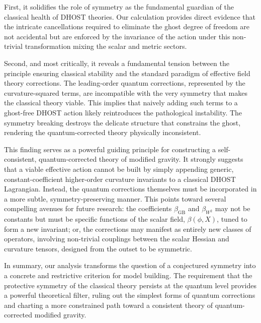 \documentclass[twocolumn]{aastex631}
\begin{document}
First, it solidifies the role of symmetry as the fundamental guardian of the classical health of DHOST theories. Our calculation provides direct evidence that the intricate cancellations required to eliminate the ghost degree of freedom are not accidental but are enforced by the invariance of the action under this non-trivial transformation mixing the scalar and metric sectors.

Second, and most critically, it reveals a fundamental tension between the principle ensuring classical stability and the standard paradigm of effective field theory corrections. The leading-order quantum corrections, represented by the curvature-squared terms, are incompatible with the very symmetry that makes the classical theory viable. This implies that naively adding such terms to a ghost-free DHOST action likely reintroduces the pathological instability. The symmetry breaking destroys the delicate structure that constrains the ghost, rendering the quantum-corrected theory physically inconsistent.

This finding serves as a powerful guiding principle for constructing a self-consistent, quantum-corrected theory of modified gravity. It strongly suggests that a viable effective action cannot be built by simply appending generic, constant-coefficient higher-order curvature invariants to a classical DHOST Lagrangian. Instead, the quantum corrections themselves must be incorporated in a more subtle, symmetry-preserving manner. This points toward several compelling avenues for future research: the coefficients $\beta_{\text{GB}}$ and $\beta_{W^2}$ may not be constants but must be specific functions of the scalar field, $\beta(\phi, X)$, tuned to form a new invariant; or, the corrections may manifest as entirely new classes of operators, involving non-trivial couplings between the scalar Hessian and curvature tensors, designed from the outset to be symmetric.

In summary, our analysis transforms the question of a conjectured symmetry into a concrete and restrictive criterion for model building. The requirement that the protective symmetry of the classical theory persists at the quantum level provides a powerful theoretical filter, ruling out the simplest forms of quantum corrections and charting a more constrained path toward a consistent theory of quantum-corrected modified gravity.
\end{document}
